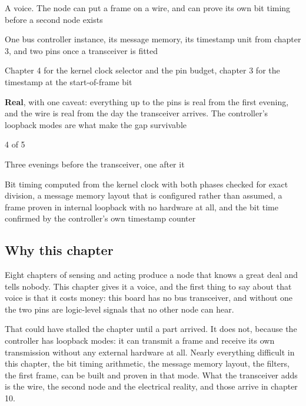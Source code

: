 
\begin{keyfacts}
\item[Adds to the node] A voice. The node can put a frame on a wire, and can prove its own bit timing before a second node exists
\item[Peripherals] One bus controller instance, its message memory, its timestamp unit from chapter 3, and two pins once a transceiver is fitted
\item[Depends on] Chapter 4 for the kernel clock selector and the pin budget, chapter 3 for the timestamp at the start-of-frame bit
\item[Real or modelled] \textbf{Real}, with one caveat: everything up to the pins is real from the first evening, and the wire is real from the day the transceiver arrives. The controller's loopback modes are what make the gap survivable
\item[Difficulty] 4 of 5
\item[Effort] Three evenings before the transceiver, one after it
\item[Deliverable] Bit timing computed from the kernel clock with both phases checked for exact division, a message memory layout that is configured rather than assumed, a frame proven in internal loopback with no hardware at all, and the bit time confirmed by the controller's own timestamp counter
\end{keyfacts}

\subsection*{Why this chapter}

Eight chapters of sensing and acting produce a node that knows a great deal and
tells nobody. This chapter gives it a voice, and the first thing to say about
that voice is that it costs money: this board has no bus transceiver, and
without one the two pins are logic-level signals that no other node can hear.

That could have stalled the chapter until a part arrived. It does not, because
the controller has loopback modes: it can transmit a frame and receive its own
transmission without any external hardware at all. Nearly everything difficult
in this chapter, the bit timing arithmetic, the message memory layout, the
filters, the first frame, can be built and proven in that mode. What the
transceiver adds is the wire, the second node and the electrical reality, and
those arrive in chapter 10.

